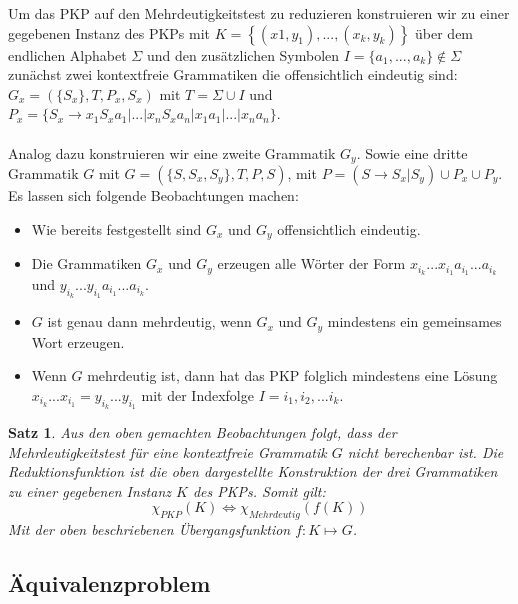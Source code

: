 \documentclass[]{scrartcl}
\newtheorem{satz}[definition]{Satz}
\begin{document}
		Um das PKP auf den Mehrdeutigkeitstest zu reduzieren konstruieren wir zu einer gegebenen Instanz des PKPs mit $K = \left\lbrace (x1, y_1), ..., (x_k, y_k) \right\rbrace$ über dem endlichen Alphabet $\Sigma$ und den zusätzlichen Symbolen $I = \{a_1, ..., a_k\} \notin \Sigma$ zunächst zwei kontextfreie Grammatiken die offensichtlich eindeutig sind:
		\newline\newline
		$G_x = (\{S_x\}, T, P_x, S_x)$ mit $T = \Sigma \cup I$ und $P_x = \{S_x \rightarrow x_1 S_x a_1 | ... | x_n S_x a_n | x_1 a_1 | ... | x_n a_n\}$.\\ \\
		Analog dazu konstruieren wir eine zweite Grammatik $G_y$. Sowie eine dritte Grammatik $G$ mit \newline\newline
		$G = (\{S, S_x, S_y\}, T, P, S)$, mit $P = (S \rightarrow S_x | S_y) \cup P_x \cup P_y$.\\
		
		Es lassen sich folgende Beobachtungen machen:
		\begin{itemize}
		\item Wie bereits festgestellt sind $G_x$ und $G_y$ offensichtlich eindeutig.
		\item Die Grammatiken $G_x$ und $G_y$ erzeugen alle Wörter der Form $x_{i_k}...x_{i_1}a_{i_1}...a_{i_k}$ und $y_{i_k}...y_{i_1}a_{i_1}...a_{i_k}$.
		\item $G$ ist genau dann mehrdeutig, wenn $G_x$ und $G_y$ mindestens ein gemeinsames Wort erzeugen.
		\item Wenn $G$ mehrdeutig ist, dann hat das PKP folglich mindestens eine Lösung $x_{i_k}...x_{i_1} = y_{i_k}...y_{i_1}$ mit der Indexfolge $I = {i_1, i_2, ... i_k}$.
		\end{itemize}
		
		\begin{satz}
		Aus den oben gemachten Beobachtungen folgt, dass der Mehrdeutigkeitstest für eine kontextfreie Grammatik $G$ nicht berechenbar ist. Die Reduktionsfunktion ist die oben dargestellte Konstruktion der drei Grammatiken zu einer gegebenen Instanz $K$ des PKPs. Somit gilt:
		\[\chi_{PKP} (K) \Leftrightarrow \chi_{Mehrdeutig}(f(K))\]
		Mit der oben beschriebenen Übergangsfunktion $f: K \mapsto G$.
		\end{satz}
		

	\subsection{Äquivalenzproblem}
	
\end{document}
